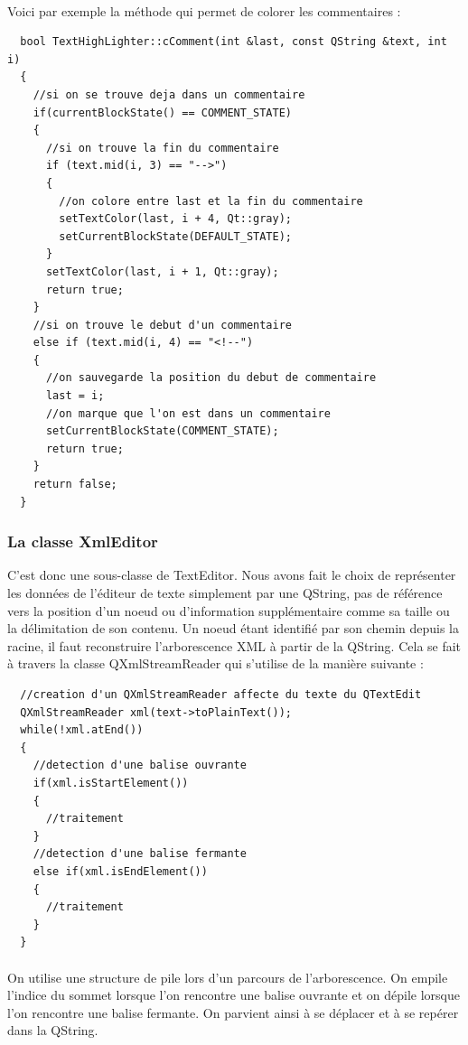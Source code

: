 \paragraph{}
Voici par exemple la méthode qui permet de colorer les commentaires :
\begin{lstlisting}
  bool TextHighLighter::cComment(int &last, const QString &text, int i)
  {
    //si on se trouve deja dans un commentaire
    if(currentBlockState() == COMMENT_STATE)
    {
      //si on trouve la fin du commentaire
      if (text.mid(i, 3) == "-->")
      {
        //on colore entre last et la fin du commentaire
        setTextColor(last, i + 4, Qt::gray);
        setCurrentBlockState(DEFAULT_STATE);
      }
      setTextColor(last, i + 1, Qt::gray);
      return true;
    }
    //si on trouve le debut d'un commentaire
    else if (text.mid(i, 4) == "<!--")
    {
      //on sauvegarde la position du debut de commentaire
      last = i;
      //on marque que l'on est dans un commentaire
      setCurrentBlockState(COMMENT_STATE);
      return true;
    }
    return false;
  }
\end{lstlisting}
\paragraph{}
\subsubsection{La classe XmlEditor}

C'est donc une sous-classe de TextEditor. Nous avons fait le choix de représenter les données de l'éditeur de texte simplement par une QString, pas de référence vers la position d'un noeud ou d'information supplémentaire comme sa taille ou la délimitation de son contenu.
Un noeud étant identifié par son chemin depuis la racine, il faut reconstruire l'arborescence XML à partir de la QString. Cela se fait à travers la classe QXmlStreamReader qui s'utilise de la manière suivante :
\begin{lstlisting}
  //creation d'un QXmlStreamReader affecte du texte du QTextEdit
  QXmlStreamReader xml(text->toPlainText());
  while(!xml.atEnd())
  {
    //detection d'une balise ouvrante
    if(xml.isStartElement())
    {
      //traitement
    }
    //detection d'une balise fermante
    else if(xml.isEndElement())
    {
      //traitement
    }
  }
\end{lstlisting}
\paragraph{}
On utilise une structure de pile lors d'un parcours de l'arborescence. On empile l'indice du sommet lorsque l'on rencontre une balise ouvrante et on dépile lorsque l'on rencontre une balise fermante.
On parvient ainsi à se déplacer et à se repérer dans la QString.

